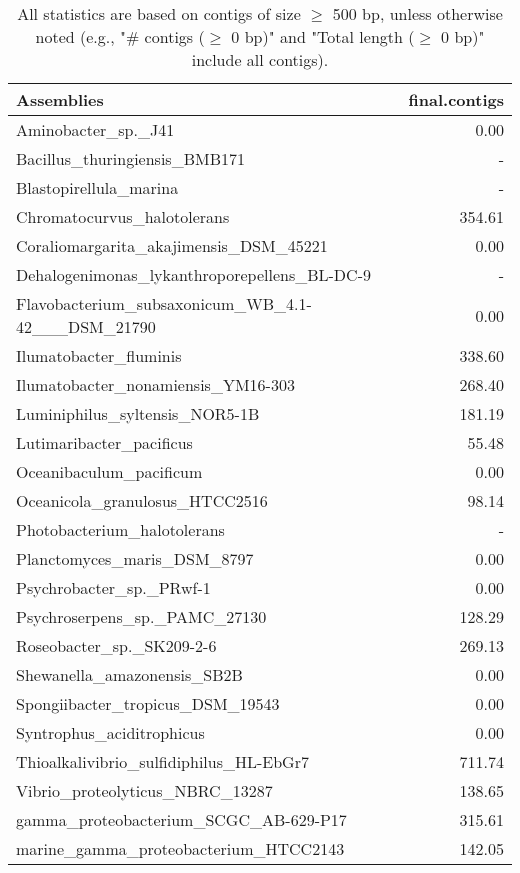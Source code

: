 \documentclass[12pt,a4paper]{article}
\begin{document}
\begin{table}[ht]
\begin{center}
\caption{All statistics are based on contigs of size $\geq$ 500 bp, unless otherwise noted (e.g., "\# contigs ($\geq$ 0 bp)" and "Total length ($\geq$ 0 bp)" include all contigs).}
\begin{tabular}{|l*{1}{|r}|}
\hline
Assemblies & final.contigs \\ \hline
Aminobacter\_sp.\_J41 & 0.00 \\ \hline
Bacillus\_thuringiensis\_BMB171 & - \\ \hline
Blastopirellula\_marina & - \\ \hline
Chromatocurvus\_halotolerans & 354.61 \\ \hline
Coraliomargarita\_akajimensis\_DSM\_45221 & 0.00 \\ \hline
Dehalogenimonas\_lykanthroporepellens\_BL-DC-9 & - \\ \hline
Flavobacterium\_subsaxonicum\_WB\_4.1-42\_\_\_DSM\_21790 & 0.00 \\ \hline
Ilumatobacter\_fluminis & 338.60 \\ \hline
Ilumatobacter\_nonamiensis\_YM16-303 & 268.40 \\ \hline
Luminiphilus\_syltensis\_NOR5-1B & 181.19 \\ \hline
Lutimaribacter\_pacificus & 55.48 \\ \hline
Oceanibaculum\_pacificum & 0.00 \\ \hline
Oceanicola\_granulosus\_HTCC2516 & 98.14 \\ \hline
Photobacterium\_halotolerans & - \\ \hline
Planctomyces\_maris\_DSM\_8797 & 0.00 \\ \hline
Psychrobacter\_sp.\_PRwf-1 & 0.00 \\ \hline
Psychroserpens\_sp.\_PAMC\_27130 & 128.29 \\ \hline
Roseobacter\_sp.\_SK209-2-6 & 269.13 \\ \hline
Shewanella\_amazonensis\_SB2B & 0.00 \\ \hline
Spongiibacter\_tropicus\_DSM\_19543 & 0.00 \\ \hline
Syntrophus\_aciditrophicus & 0.00 \\ \hline
Thioalkalivibrio\_sulfidiphilus\_HL-EbGr7 & 711.74 \\ \hline
Vibrio\_proteolyticus\_NBRC\_13287 & 138.65 \\ \hline
gamma\_proteobacterium\_SCGC\_AB-629-P17 & 315.61 \\ \hline
marine\_gamma\_proteobacterium\_HTCC2143 & 142.05 \\ \hline
\end{tabular}
\end{center}
\end{table}
\end{document}
